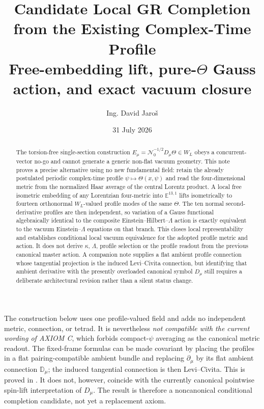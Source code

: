 \documentclass[11pt,a4paper]{article}
\title{Candidate Local GR Completion from the Existing Complex-Time Profile\\
\large Free-embedding lift, pure-$\Theta$ Gauss action, and exact vacuum closure}
\author{Ing. David Jaro\v{s}}
\date{31 July 2026}
\theoremstyle{remark}
\newcommand{\Nzero}{\mathcal N_0}
\begin{document}
\maketitle

\begin{abstract}
The torsion-free single-section construction
$E_\mu=\Nzero^{-1/2}D_\mu\Theta\in W_L$ obeys a concurrent-vector no-go and
cannot generate a generic non-flat vacuum geometry.  This note proves a
precise alternative using no new fundamental field: retain the already
postulated periodic complex-time profile $\psi\mapsto\Theta(x,\psi)$ and read
the four-dimensional metric from the normalized Haar average of the central
Lorentz product.  A local free isometric embedding of any Lorentzian
four-metric into $\mathbb E^{13,1}$ lifts isometrically to fourteen orthonormal
$W_L$-valued profile modes of the same $\Theta$.  The ten normal
second-derivative profiles are then independent, so variation of a
Gauss functional algebraically identical to the composite
Einstein--Hilbert--$\Lambda$ action is exactly equivalent to the vacuum
Einstein--$\Lambda$ equations on that branch.  This closes local
representability and establishes conditional local vacuum equivalence for the
adopted profile metric and action.  It does not derive $\kappa$, $\Lambda$,
profile selection or the profile readout from the previous canonical master
action.  A companion note supplies a flat ambient profile connection whose
tangential projection is the induced Levi--Civita connection, but identifying
that ambient derivative with the presently overloaded canonical symbol
$D_\mu$ still requires a deliberate architectural revision rather than a
silent status change.
\end{abstract}

\begin{tcolorbox}[colback=yellow!5,colframe=yellow!55!black,title=Canonical impact]
The construction below uses one profile-valued field and adds no independent
metric, connection, or tetrad.  It is nevertheless \emph{not compatible with
the current wording of AXIOM C}, which forbids compact-$\psi$ averaging as the
canonical metric readout.  The fixed-frame formulas can be made covariant by placing the profiles in a
flat pairing-compatible ambient bundle and replacing $\partial_\mu$ by its
flat ambient connection $\mathbb D_\mu$; the induced tangential connection is
then Levi--Civita.  This is proved in
.  It does not,
however, coincide with the currently canonical pointwise spin-lift
interpretation of $D_\mu$.  The result is therefore a noncanonical conditional
completion candidate, not yet a replacement axiom.
\end{tcolorbox}
\end{document}

